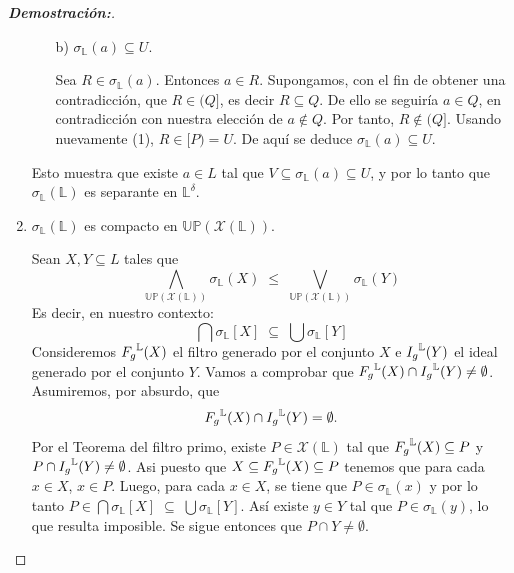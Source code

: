\documentclass[12pt]{book}
\newcommand{\Fg}{\mathnormal{F_g}}
\newcommand{\Ig}{\mathnormal{I_g}}
\newcommand{\Up}{\mathbb{UP}}
\begin{document}
\begin{proof}[\textbf{Demostración:}]
\begin{enumerate}
\begin{itemize}
\item[b)] \(\sigma_{\mathbb{L}}(a)\subseteq U\).

Sea \(R\in\sigma_{\mathbb{L}}(a)\).
Entonces \(a\in R\).
Supongamos, con el fin de obtener una contradicción, que
\(R\in(Q]\), es decir \(R\subseteq Q\).
De ello se seguiría \(a\in Q\),
en contradicción con nuestra elección de \(a\notin Q\).
Por tanto, \(R\notin(Q]\).
Usando nuevamente (1), \(R\in [P)=U\).
De aquí se deduce \(\sigma_{\mathbb{L}}(a)\subseteq U\).
\end{itemize}

Esto muestra que existe \(a\in L\) tal que
\(V \subseteq \sigma_{\mathbb{L}}(a)\subseteq U\),
y por lo tanto que \(\sigma_{\mathbb{L}}(\mathbb L)\) es separante en
\(\mathbb{L}^{\delta}\).


\item $\sigma_{\mathbb{L}}(\mathbb L)$ es compacto en $\Up(\mathcal{X}(\mathbb L))$.

Sean $X,Y\subseteq L$ tales que
\[
\bigwedge_{\Up(\mathcal{X}(\mathbb L))}\sigma_{\mathbb{L}}(X)\;\le\;
\bigvee_{\Up(\mathcal{X}(\mathbb L))}\sigma_{\mathbb{L}}(Y)
\]
Es decir, en nuestro contexto:
\[
\bigcap\sigma_{\mathbb{L}}[X]\;\subseteq\;\bigcup\sigma_{\mathbb{L}}[Y]
\]
Consideremos $\Fg^{\mathbb{L}}(X)$ el filtro generado por el conjunto $X$ e $\Ig^{\mathbb{L}}(Y)$ el ideal generado por el conjunto $Y$. Vamos a comprobar que $\Fg^{\mathbb{L}}(X)\cap \Ig^{\mathbb{L}}(Y)\neq\emptyset$. Asumiremos, por absurdo, que 
\[ \Fg^{\mathbb{L}}(X)\cap \Ig^{\mathbb{L}}(Y) = \emptyset. \]
Por el Teorema del filtro primo, existe $P\in\mathcal{X}(\mathbb{L})$ tal que $\Fg^{\mathbb{L}}(X)\subseteq P$ y $P\cap \Ig^{\mathbb{L}}(Y)\neq\emptyset$. Asi puesto que $X\subseteq \Fg^{\mathbb{L}}(X)\subseteq P$ tenemos que para cada $x \in X$,  $x\in P$.  Luego, para cada $x \in X$, se tiene que $P\in \sigma_{\mathbb{L}}(x)$ y por lo tanto $P\in\bigcap\sigma_{\mathbb{L}}[X]\;\subseteq\;\bigcup\sigma_{\mathbb{L}}[Y]$. Así existe $y\in Y$ tal que $P\in \sigma_{\mathbb{L}}(y)$, lo que resulta imposible. Se sigue entonces que $P\cap Y\neq \emptyset$. 


\end{enumerate}
\end{proof}
\end{document}
